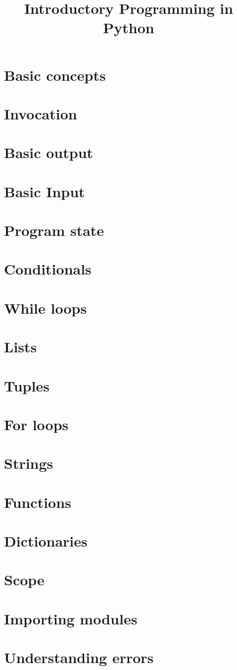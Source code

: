 \documentclass[a4paper,11pt]{report}
\title{Introductory Programming in Python}
\begin{document}
\maketitle
\chapter{Basic concepts}
    
\chapter{Invocation}
    
\chapter{Basic output}
    
\chapter{Basic Input}
    
\chapter{Program state}
    
\chapter{Conditionals}
    
\chapter{While loops}
    
\chapter{Lists}
    
\chapter{Tuples}
    
\chapter{For loops}
    
\chapter{Strings}
    
\chapter{Functions}
    
\chapter{Dictionaries}
    
\chapter{Scope}
    
\chapter{Importing modules}
    
\chapter{Understanding errors}
    
\end{document}

